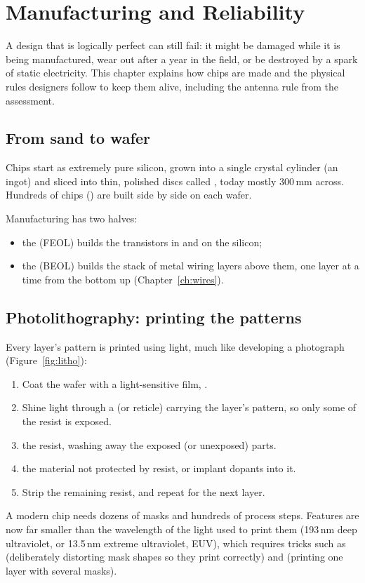 \chapter{Manufacturing and Reliability}
\label{ch:fab}

A design that is logically perfect can still fail: it might be damaged while it is being manufactured, wear out after a year in the field, or be destroyed by a spark of static electricity. This chapter explains how chips are made and the physical rules designers follow to keep them alive, including the antenna rule from the assessment.

\section{From sand to wafer}

Chips start as extremely pure silicon, grown into a single crystal cylinder (an ingot) and sliced into thin, polished discs called , today mostly 300\,mm across. Hundreds of chips () are built side by side on each wafer.

Manufacturing has two halves:
\begin{itemize}
  \item the  (FEOL) builds the transistors in and on the silicon;
  \item the  (BEOL) builds the stack of metal wiring layers above them, one layer at a time from the bottom up (Chapter~\ref{ch:wires}).
\end{itemize}

\section{Photolithography: printing the patterns}

Every layer's pattern is printed using light, much like developing a photograph (Figure~\ref{fig:litho}):
\begin{enumerate}
  \item Coat the wafer with a light-sensitive film, .
  \item Shine light through a  (or reticle) carrying the layer's pattern, so only some of the resist is exposed.
  \item {} the resist, washing away the exposed (or unexposed) parts.
  \item {} the material not protected by resist, or implant dopants into it.
  \item Strip the remaining resist, and repeat for the next layer.
\end{enumerate}
A modern chip needs dozens of masks and hundreds of process steps. Features are now far smaller than the wavelength of the light used to print them (193\,nm deep ultraviolet, or 13.5\,nm extreme ultraviolet, EUV), which requires tricks such as  (deliberately distorting mask shapes so they print correctly) and  (printing one layer with several masks).

